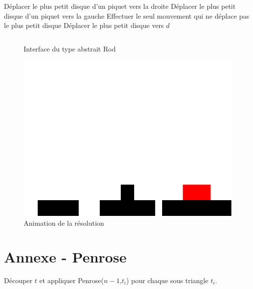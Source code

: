 \documentclass[a4paper,13pt]{article}
\begin{document}
\begin{algorithm}[H]
  \caption{Hanoi($n$, $s$, $i$, $d$)}
  \label{alg:hanoiiter}
  {
      {Déplacer le plus petit disque d'un piquet vers la droite}
      {Déplacer le plus petit disque d'un piquet vers la gauche}
    Effectuer le seul mouvement qui ne déplace pas le plus petit disque
  }
  Déplacer le plus petit disque vers $d$
\end{algorithm}

\begin{figure}[h]
\inputminted[frame=lines,linenos]{ocaml}{../hanoi/api_rod.mli}
\caption{Interface du type abstrait Rod}
\label{fig:rod}
\end{figure}

\begin{figure}[h]
\caption{Animation de la résolution}
\begin{center}
\includegraphics[scale=0.2]{../diapo/anim_hanoi.png}
\end{center}
\label{fig:hanoiimg}
\end{figure}

\clearpage
\section{Annexe - Penrose}
\begin{algorithm}[H]
\label{algo:penrose}
  \caption{Penrose($n$, $t$)}
  \label{alg:penrose}
  { Découper $t$ et appliquer Penrose($n-1$,$t_i$) pour chaque sous triangle $t_i$.
   }
\end{algorithm}
\end{document}
